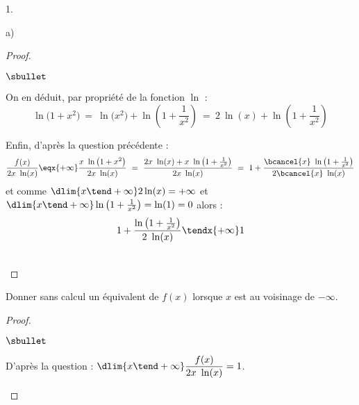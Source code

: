 \begin{noliste}{1.}
\begin{noliste}{a)}
\begin{proof}
\begin{noliste}{$\sbullet$}
      \item On en déduit, par propriété de la fonction $\ln$ :
        \[
        \ln\big( 1 + x^2 \big) \ = \ \ln\big (x^2 \big) + \ln \left(1
          + \dfrac{1}{x^2} \right) \ = \ 2 \ \ln(x) + \ln \left(1 +
          \dfrac{1}{x^2} \right)
        \]

      \item Enfin, d'après la question précédente :
        \[
        \dfrac{f(x)}{2x \ \ln(x)} \eqx{+\infty} \dfrac{x \ \ln\big( 1
          + x^2 \big)}{2x \ \ln(x)} \ = \ \dfrac{2x \ \ln(x) + x \ \ln
          \left(1 + \frac{1}{x^2} \right)}{2x \ \ln(x)} \ = \ 1 +
        \dfrac{\bcancel{x} \ \ln \left(1 + \frac{1}{x^2} \right)}{2
          \bcancel{x} \ \ln(x)}
        \]
        et comme $\dlim{x \tend +\infty} 2 \ln(x) = +\infty$ et
        $\dlim{x \tend + \infty} \ln \left(1 + \frac{1}{x^2} \right) =
        \ln(1) = 0$ alors :
        \[
        1 + \dfrac{\ln \left(1 + \frac{1}{x^2} \right)}{2 \ \ln(x)}
        \tendx{+\infty} 1
        \]
      \end{noliste}
      ~\\[-1.2cm]
    \end{proof}

  \item Donner sans calcul un équivalent de $f(x)$ lorsque $x$ est au
    voisinage de $-\infty$.

    \begin{proof}~%
      \begin{noliste}{$\sbullet$}
      \item D'après la question  : %
        $
        \dlim{x \tend +\infty} \dfrac{f(x)}{2x \ \ln(x)} = 1
        $.


\end{noliste}
\end{proof}
\end{noliste}
\end{noliste}
